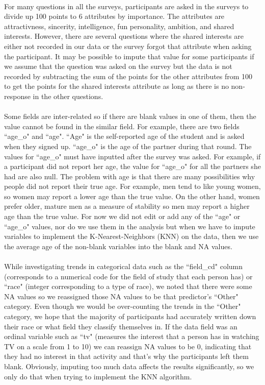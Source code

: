 \documentclass{article}
\begin{document}
\null\\
For many questions in all the surveys, participants are asked in the surveys to divide up 100 points to 6 attributes by importance.  The attributes are attractivness, sincerity, intelligence, fun personality, ambition, and shared interests.  However, there are several questions where the shared interests are either not recorded in our data or the survey forgot that attribute when asking the participant.  It may be possible to impute that value for some participants if we assume that the question was asked on the survey but the data is not recorded by subtracting the sum of the points for the other attributes from 100 to get the points for the shared interests attribute as long as there is no non-response in the other questions.\\
\null\\
Some fields are inter-related so if there are blank values in one of them, then the value cannot be found in the similar field. For example, there are two fields ``age\_o" and ``age". ``Age" is the self-reported age of the student and is asked when they signed up. ``age\_o" is the age of the partner during that round.  The values for ``age\_o" must have inputted after the survey was asked.  For example, if a participant did not report her age, the value for ``age\_o" for all the partners she had are also null.  The problem with age is that there are many possibilities why people did not report their true age.  For example, men tend to like young women, so women may report a lower age than the true value.  On the other hand, women prefer older, mature men as a measure of stability so men may report a higher age than the true value.  For now we did not edit or add any of the ``age" or ``age\_o" values, nor do we use them in the analysis but when we have to impute variables to implement the K-Nearest-Neighbors (KNN) on the data, then we use the average age of the non-blank variables into the blank and NA values.\\
\null\\
While investigating trends in categorical data such as the ``field\_cd" column (corresponds to a numerical code for the field of study that each person has) or ``race" (integer corresponding to a type of race), we noted that there were some NA values so we reassigned those NA values to be that predictor's ``Other" category.  Even though we would be over-counting the trends in the ``Other" category, we hope that the majority of participants had accurately written down their race or what field they classify themselves in.  If the data field was an ordinal variable such as ``tv" (measures the interest that a person has in watching TV on a scale from 1 to 10) we can reassign NA values to be 0, indicating that they had no interest in that activity and that's why the participants left them blank.  Obviously, imputing too much data affects the results significantly, so we only do that when trying to implement the KNN algorithm.\\
\end{document}
